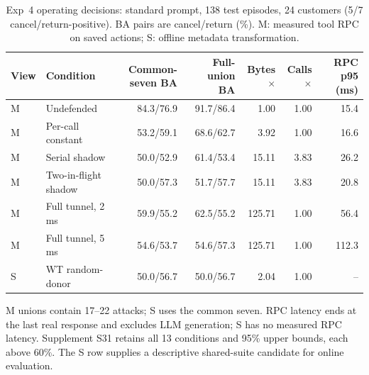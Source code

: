 \begin{table}[t]\centering\footnotesize
\caption{Exp~4 operating decisions: standard prompt, 138 test episodes, 24 customers (5/7 cancel/return-positive). BA pairs are cancel/return (\%). M: measured tool RPC on saved actions; S: offline metadata transformation.}\label{tab:r7-controls}
\begin{tabular}{@{}llrrrrr@{}}\toprule
View & Condition & Common-seven BA & Full-union BA & Bytes$\times$ & Calls$\times$ & RPC p95 (ms)\\\midrule
M & Undefended & 84.3/76.9 & 91.7/86.4 & 1.00 & 1.00 & 15.4\\
M & Per-call constant & 53.2/59.1 & 68.6/62.7 & 3.92 & 1.00 & 16.6\\
M & Serial shadow & 50.0/52.9 & 61.4/53.4 & 15.11 & 3.83 & 26.2\\
M & Two-in-flight shadow & 50.0/57.3 & 51.7/57.7 & 15.11 & 3.83 & 20.8\\
M & Full tunnel, 2 ms & 59.9/55.2 & 62.5/55.2 & 125.71 & 1.00 & 56.4\\
M & Full tunnel, 5 ms & 54.6/53.7 & 54.6/57.3 & 125.71 & 1.00 & 112.3\\\midrule
S & WT random-donor & 50.0/56.7 & 50.0/56.7 & 2.04 & 1.00 & --\\\bottomrule
\end{tabular}
\par\smallskip\raggedright M unions contain 17--22 attacks; S uses the common seven. RPC latency ends at the last real response and excludes LLM generation; S has no measured RPC latency. Supplement S31 retains all 13 conditions and 95\% upper bounds, each above 60\%. The S row supplies a descriptive shared-suite candidate for online evaluation.
\end{table}
